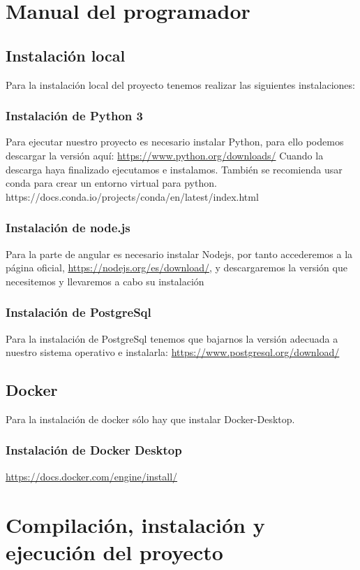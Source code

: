 \section{Manual del programador}
\subsection {Instalación local}
Para la instalación local del proyecto tenemos realizar las siguientes instalaciones:
\subsubsection {Instalación de Python 3}
Para ejecutar nuestro proyecto es necesario instalar Python, para ello
podemos descargar la versión aquí: \url{https://www.python.org/downloads/}
Cuando la descarga haya finalizado ejecutamos e instalamos.
También se recomienda usar conda para crear un entorno virtual para python. 
https://docs.conda.io/projects/conda/en/latest/index.html
\subsubsection {Instalación de node.js}
Para la parte de angular es necesario instalar Nodejs, por tanto accederemos 
a la página oficial, \url{https://nodejs.org/es/download/}, 
y descargaremos la versión que necesitemos y llevaremos a cabo su instalación

\subsubsection {Instalación de PostgreSql}
Para la instalación de PostgreSql tenemos que bajarnos la versión adecuada a nuestro sistema operativo e instalarla:
\url{https://www.postgresql.org/download/}

\subsection {Docker}
Para la instalación de docker sólo hay que instalar Docker-Desktop.
\subsubsection {Instalación de Docker Desktop}
\url{https://docs.docker.com/engine/install/}

\section{Compilación, instalación y ejecución del proyecto}
